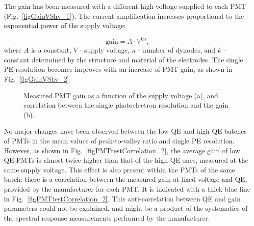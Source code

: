 The gain has been measured with a different high voltage supplied to each PMT (Fig.~\ref{figGainVShv_1}). The current amplification increases proportional to the exponential power of the supply voltage:

\begin{equation}
\mathrm{gain} = A \cdot V^{kn},
\end{equation} 
where $A$ is a constant, $V$ - supply voltage, $n$ - number of dynodes, and $k$ - constant determined by the structure and material of the electrodes. 
The single PE resolution becomes improves with an increase of PMT gain, as shown in Fig.~\ref{figGainVShv_2}.

\begin{figure}[!t]
\centering
{}
\caption[Measured PMT gain as a function of the supply voltage and the correlation between single photoelectron resolution and  gain]{Measured PMT gain as a function of the supply voltage (a), and correlation between the single photoelectron resolution and the gain (b).}

\label{figGainVShv}
\end{figure}


No major changes have been observed between the low QE and high QE batches of PMTs in the mean values of peak-to-valley ratio and single PE resolution. However, as shown in Fig.~\ref{figPMTtestCorrelation_2}, the average gain of low QE PMTs is almost twice higher than that of the high QE ones, measured at the same supply voltage. This effect is also present within the PMTs of the same batch: there is a  correlation between the measured gain at fixed voltage and QE, provided by the manufacturer for each PMT. It is indicated with a thick blue line in Fig.~\ref{figPMTtestCorrelation_2}. This anti-correlation between QE and gain parameters could not be explained, and might be a product of the systematics of the spectral response measurements performed by the manufacturer.

